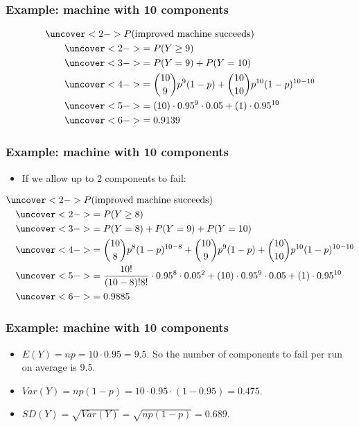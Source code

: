 \documentclass[handout]{beamer}\usepackage{graphicx, color}
\numberwithin{equation}{section}
\begin{document}
\begin{frame}
\frametitle{Example: machine with 10 components}

\begin{align*}
&\uncover<2->{P(\text{improved machine succeeds)}} \\
& \qquad \uncover<2->{= P(Y \ge 9)} \\
&\qquad \uncover<3->{= P(Y = 9) + P(Y = 10)} \\
&\qquad  \uncover<4->{=\binom{10}{9}p^9 (1-p) + \binom{10}{10} p^{10} (1-p)^{10 - 10}} \\
&\qquad \uncover<5->{=(10) \cdot 0.95^9 \cdot 0.05 + (1) \cdot 0.95^{10}} \\
&\qquad \uncover<6->{= 0.9139}
\end{align*}
\begin{itemize}
\end{itemize}

\end{frame}\begin{frame}
\frametitle{Example: machine with 10 components}
\begin{itemize}
\item If we allow up to 2 components to fail:
\end{itemize}
\small
\begin{align*}
&\uncover<2->{P(\text{improved machine succeeds)}} \\
& \quad \uncover<2->{= P(Y \ge 8)} \\
&\quad \uncover<3->{= P(Y = 8) + P(Y = 9) + P(Y = 10)} \\
&\quad  \uncover<4->{=\binom{10}{8} p^8 (1-p)^{10 - 8} + \binom{10}{9}p^9 (1-p) + \binom{10}{10} p^{10} (1-p)^{10 - 10}} \\
&\quad \uncover<5->{=\frac{10!}{(10-8)!8!} \cdot 0.95^8 \cdot 0.05^2 + (10) \cdot 0.95^9 \cdot 0.05 + (1) \cdot 0.95^{10}} \\
&\quad \uncover<6->{= 0.9885}
\end{align*}


\end{frame}
\begin{frame}
\frametitle{Example: machine with 10 components}

\begin{itemize}
 \item $E(Y) = np = 10 \cdot 0.95 = 9.5$. So the number of components to fail per run on average is 9.5.
\pause \item $Var(Y) = np(1-p) = 10 \cdot 0.95 \cdot (1- 0.95) = 0.475$.
\pause \item $SD(Y) = \sqrt{Var(Y)} = \sqrt{np(1-p)}  =0.689$. 
\end{itemize}

\end{frame}
\end{document}
